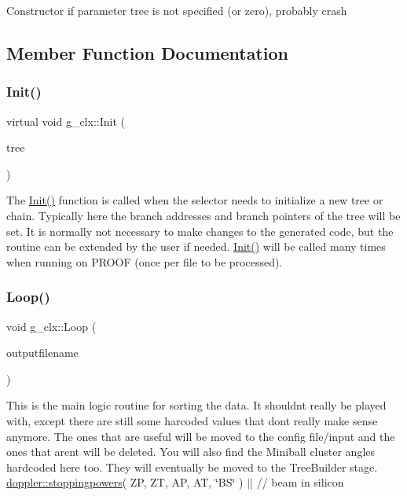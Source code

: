 Constructor if parameter tree is not specified (or zero), probably crash 

\subsection{Member Function Documentation}
\mbox{\label{classg__clx_a92531261155ea15bee6b74c7e491132a}} 
\subsubsection{\texorpdfstring{Init()}{Init()}}
{\footnotesize\ttfamily virtual void g\+\_\+clx\+::\+Init (\begin{DoxyParamCaption}\item[{T\+Tree $\ast$}]{tree }\end{DoxyParamCaption})\hspace{0.3cm}{\ttfamily [virtual]}}

The \hyperlink{classg__clx_a92531261155ea15bee6b74c7e491132a}{Init()} function is called when the selector needs to initialize a new tree or chain. Typically here the branch addresses and branch pointers of the tree will be set. It is normally not necessary to make changes to the generated code, but the routine can be extended by the user if needed. \hyperlink{classg__clx_a92531261155ea15bee6b74c7e491132a}{Init()} will be called many times when running on P\+R\+O\+OF (once per file to be processed). \mbox{\label{classg__clx_a9d5de859df4bfbb746726661ff1d24a9}} 
\subsubsection{\texorpdfstring{Loop()}{Loop()}}
{\footnotesize\ttfamily void g\+\_\+clx\+::\+Loop (\begin{DoxyParamCaption}\item[{string}]{outputfilename }\end{DoxyParamCaption})\hspace{0.3cm}{\ttfamily [virtual]}}

This is the main logic routine for sorting the data. It shouldn\textquotesingle{}t really be played with, except there are still some harcoded values that don\textquotesingle{}t really make sense anymore. The ones that are useful will be moved to the config file/input and the ones that aren\textquotesingle{}t will be deleted. You will also find the Miniball cluster angles hardcoded here too. They will eventually be moved to the Tree\+Builder stage. \hyperlink{classdoppler_ad91321c9c9220fff724e5e0982e1a8b8}{doppler\+::stoppingpowers}( ZP, ZT, AP, AT, \char`\"{}\+B\+S\char`\"{} ) $\vert$$\vert$ // beam in silicon \mbox{\label{classg__clx_a1fe81316168bc18dc2325ca5595577a9}} 
